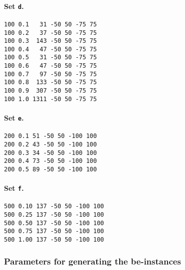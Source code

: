 \documentclass[a4paper, 12pt]{article}
\begin{document}
\noindent
\begin{minipage}[t]{4cm}
\paragraph{Set {\tt d}.}
\begin{tiny}
\begin{verbatim}
100 0.1   31 -50 50 -75 75
100 0.2   37 -50 50 -75 75
100 0.3  143 -50 50 -75 75
100 0.4   47 -50 50 -75 75
100 0.5   31 -50 50 -75 75
100 0.6   47 -50 50 -75 75
100 0.7   97 -50 50 -75 75
100 0.8  133 -50 50 -75 75
100 0.9  307 -50 50 -75 75
100 1.0 1311 -50 50 -75 75
\end{verbatim}
\end{tiny}
\end{minipage}
\hfill
\begin{minipage}[t]{4cm}
\paragraph{Set {\tt e}.}
\begin{tiny}
\begin{verbatim}
200 0.1 51 -50 50 -100 100
200 0.2 43 -50 50 -100 100
200 0.3 34 -50 50 -100 100
200 0.4 73 -50 50 -100 100
200 0.5 89 -50 50 -100 100
\end{verbatim}
\end{tiny}
\end{minipage}
\hfill
\begin{minipage}[t]{4cm}
\paragraph{Set {\tt f}.}
\begin{tiny}
\begin{verbatim}
500 0.10 137 -50 50 -100 100
500 0.25 137 -50 50 -100 100
500 0.50 137 -50 50 -100 100
500 0.75 137 -50 50 -100 100
500 1.00 137 -50 50 -100 100
\end{verbatim}
\end{tiny}
\end{minipage}


\subsubsection*{Parameters for generating the be-instances}
\end{document}
